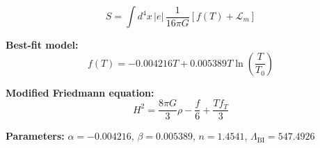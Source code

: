 
\begin{equation}
  S = \int d^4x \, |e| \, \frac{1}{16\pi G} \left[ f(T) + \mathcal{L}_m \right]
\end{equation}

\textbf{Best-fit model:}
\begin{equation}
  f(T) = -0.004216 T + 0.005389 T \ln\!\left(\frac{T}{T_0}\right)
\end{equation}

\textbf{Modified Friedmann equation:}
\begin{equation}
  H^2 = \frac{8\pi G}{3} \rho - \frac{f}{6} + \frac{T f_T}{3}
\end{equation}

\textbf{Parameters:}
$\alpha = -0.004216$, \quad
$\beta = 0.005389$, \quad
$n = 1.4541$, \quad
$\Lambda_{\text{BI}} = 547.4926$